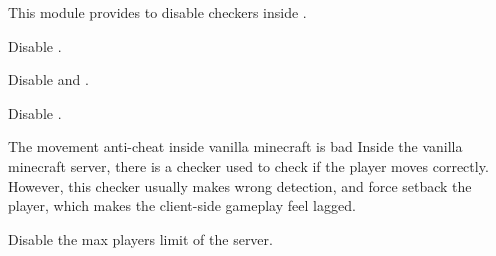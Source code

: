 This module provides  to disable checkers inside .

Disable .

Disable  and .

Disable .

\begin{warn}{The movement anti-cheat inside vanilla minecraft is bad}
    Inside the vanilla minecraft server, there is a checker used to check if the player moves correctly.
    However, this checker usually makes wrong detection, and force setback the player, which makes the client-side gameplay feel lagged.
\end{warn}

Disable the max players limit of the server.